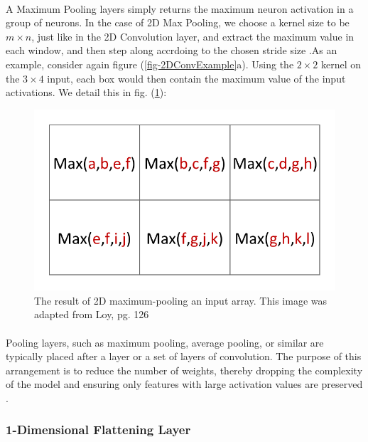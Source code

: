 \documentclass[12pt,letterpaper]{article}
\begin{document}
\paragraph*{}A Maximum Pooling layers simply returns the maximum neuron activation in a group of neurons. In the case of 2D Max Pooling, we choose a kernel size to be $m \times n$, just like in the 2D Convolution layer, and extract the maximum value in each window, and then step along accrdoing to the chosen stride size \cite{Loy,Goodfellow}.As an example, consider again figure (\ref{fig-2DConvExample}a). Using the $2 \times 2$ kernel on the $3 \times 4$ input, each box would then contain the maximum value of the input activations. We detail this in fig. (\ref{fig-2DMaxPool}):
\begin{figure}[h]
\label{fig-2DMaxPool}
\begin{center}
\includegraphics[scale=0.6]{../figures/2DConvExample(d)}
\end{center}
\caption{The result of 2D maximum-pooling an input array. This image was adapted from Loy, pg. 126 \cite{Loy}}
\end{figure} 

\paragraph*{}Pooling layers, such as maximum pooling, average pooling, or similar are typically placed after a layer or a set of layers of convolution. The purpose of this arrangement is to reduce the number of weights, thereby dropping the complexity of the model and ensuring only features with large activation values are preserved \cite{Geron,Loy,Goodfellow}.


\subsubsection{1-Dimensional Flattening Layer}
\end{document}
